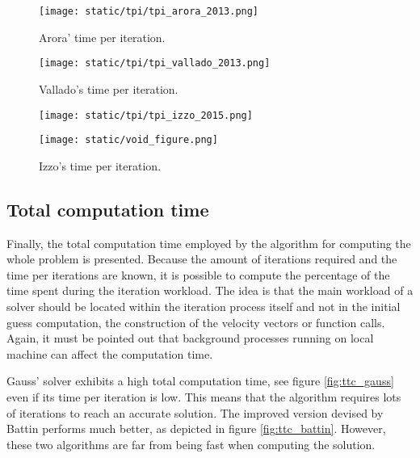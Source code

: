 \begin{figure}[H]
  \begin{minipage}{0.48\textwidth}
    \centering
    \texttt{[image: static/tpi/tpi\_arora\_2013.png]}
    \caption{Arora' time per iteration.}\label{fig:tpi_arora}
  \end{minipage}\hfill
  \begin{minipage}{0.48\textwidth}
    \centering
    \texttt{[image: static/tpi/tpi\_vallado\_2013.png]}
    \caption{Vallado's time per iteration.}\label{fig:tpi_vallado}
  \end{minipage}
\end{figure}

\begin{figure}[H]
  \begin{minipage}{0.48\textwidth}
    \centering
    \texttt{[image: static/tpi/tpi\_izzo\_2015.png]}
    \caption{Izzo's time per iteration.}\label{fig:tpi_izzo}
  \end{minipage}\hfill
  \begin{minipage}{0.48\textwidth}
    \centering
    \texttt{[image: static/void\_figure.png]}
  \end{minipage}
\end{figure}


\subsection{Total computation time}

Finally, the total computation time employed by the algorithm for computing the
whole problem is presented. Because the amount of iterations required and the
time per iterations are known, it is possible to compute the percentage of the
time spent during the iteration workload. The idea is that the main workload of
a solver should be located within the iteration process itself and not in the
initial guess computation, the construction of the velocity vectors or function
calls. Again, it must be pointed out that background processes running on local
machine can affect the computation time. 

Gauss' solver exhibits a high total computation time, see figure
\ref{fig:ttc_gauss} even if its time per iteration is low. This means that the
algorithm requires lots of iterations to reach an accurate solution. The
improved version devised by Battin performs much better, as depicted in figure
\ref{fig:ttc_battin}. However, these two algorithms are far from being fast when
computing the solution.

